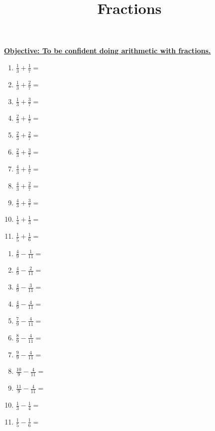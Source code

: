 \documentclass{article}
\begin{document}
\title{Fractions}
\date{}

\maketitle
\thispagestyle{empty}

\Large

\textbf{\underline{Objective: To be confident doing arithmetic with fractions.}}

\vspace{5mm}



\begin{enumerate}
	\item $\frac{1}{3}+\frac{1}{7}=$
	\item $\frac{1}{3}+\frac{2}{7}=$
	\item $\frac{1}{3}+\frac{3}{7}=$
	\item $\frac{2}{3}+\frac{1}{7}=$
	\item $\frac{2}{3}+\frac{2}{7}=$
	\item $\frac{2}{3}+\frac{3}{7}=$
	\item $\frac{4}{3}+\frac{1}{7}=$
	\item $\frac{4}{3}+\frac{2}{7}=$
	\item $\frac{4}{3}+\frac{3}{7}=$
	\item $\frac{1}{4}+\frac{1}{3}=$
	\item $\frac{1}{5}+\frac{1}{6}=$
\end{enumerate}

\clearpage



\begin{enumerate}
	\item $\frac{4}{9}-\frac{1}{11}=$
	\item $\frac{4}{9}-\frac{2}{11}=$
	\item $\frac{4}{9}-\frac{3}{11}=$
	\item $\frac{4}{9}-\frac{4}{11}=$
	\item $\frac{7}{9}-\frac{4}{11}=$
	\item $\frac{8}{9}-\frac{4}{11}=$
	\item $\frac{9}{9}-\frac{4}{11}=$
	\item $\frac{10}{9}-\frac{4}{11}=$
	\item $\frac{11}{9}-\frac{4}{11}=$
	\item $\frac{1}{3}-\frac{1}{4}=$
	\item $\frac{1}{5}-\frac{1}{6}=$
\end{enumerate}
\end{document}
